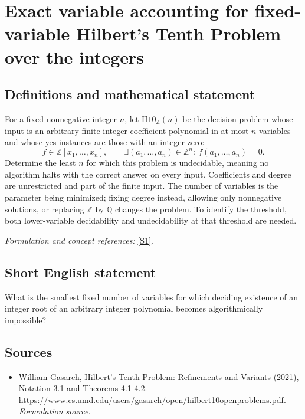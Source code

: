 \documentclass[11pt]{article}
\begin{document}
\section*{\texorpdfstring{Exact variable accounting for fixed-variable Hilbert's Tenth Problem over the integers}{Exact variable accounting for fixed-variable Hilbert's Tenth Problem over the integers}}\label{20002352}
\subsection{Definitions and mathematical statement}
For a fixed nonnegative integer $n$, let $\mathrm{H10}_{{\mathbb{Z}}}(n)$ be the decision problem whose input is an arbitrary finite integer-coefficient polynomial in at most $n$ variables and whose yes-instances are those with an integer zero:
\[
 f\in{\mathbb{Z}}[x_1,\ldots,x_n],\qquad
 \exists (a_1,\ldots,a_n)\in{\mathbb{Z}}^n:\ f(a_1,\ldots,a_n)=0.
\]
Determine the least $n$ for which this problem is undecidable, meaning no algorithm halts with the correct answer on every input. Coefficients and degree are unrestricted and part of the finite input. The number of variables is the parameter being minimized; fixing degree instead, allowing only nonnegative solutions, or replacing ${\mathbb{Z}}$ by ${\mathbb{Q}}$ changes the problem. To identify the threshold, both lower-variable decidability and undecidability at that threshold are needed.
\par\smallskip\textit{Formulation and concept references:} \href{https://www.cs.umd.edu/users/gasarch/open/hilbert10openproblems.pdf}{[S1]}.

\subsection{Short English statement}
What is the smallest fixed number of variables for which deciding existence of an integer root of an arbitrary integer polynomial becomes algorithmically impossible?
\subsection{Sources}
\begin{itemize}
\item[S1]William Gasarch, Hilbert's Tenth Problem: Refinements and Variants (2021), Notation 3.1 and Theorems 4.1-4.2.
\url{https://www.cs.umd.edu/users/gasarch/open/hilbert10openproblems.pdf}.
\textit{Formulation source.}
\end{itemize}
\end{document}
